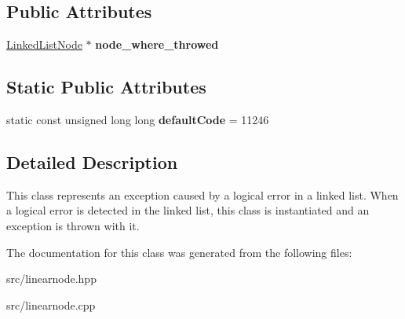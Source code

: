 \subsection*{Public Attributes}
\begin{DoxyCompactItemize}
\item 
\mbox{\label{classDataJuggler_1_1DamagedLinkedListEx_afd9cb052b1989a06612862adef82eeb6}} 
\hyperlink{classDataJuggler_1_1LinkedListNode}{Linked\+List\+Node} $\ast$ {\bfseries node\+\_\+where\+\_\+throwed}
\end{DoxyCompactItemize}
\subsection*{Static Public Attributes}
\begin{DoxyCompactItemize}
\item 
\mbox{\label{classDataJuggler_1_1DamagedLinkedListEx_abb7d42fefb001c0e6370ae703bee976e}} 
static const unsigned long long {\bfseries default\+Code} = 11246
\end{DoxyCompactItemize}


\subsection{Detailed Description}
This class represents an exception caused by a logical error in a linked list. When a logical error is detected in the linked list, this class is instantiated and an exception is thrown with it. 

The documentation for this class was generated from the following files\+:\begin{DoxyCompactItemize}
\item 
src/linearnode.\+hpp\item 
src/linearnode.\+cpp\end{DoxyCompactItemize}
